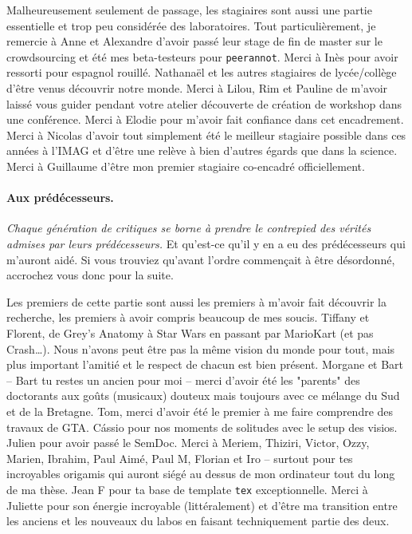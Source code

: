 Malheureusement seulement de passage, les stagiaires sont aussi une partie essentielle et trop peu considérée des laboratoires.
Tout particulièrement, je remercie à Anne et Alexandre d'avoir passé leur stage de fin de master sur le crowdsourcing et été mes beta-testeurs pour \texttt{peerannot}.
Merci à Inès pour avoir ressorti pour espagnol rouillé.
Nathanaël et les autres stagiaires de lycée/collège d'être venus découvrir notre monde.
Merci à Lilou, Rim et Pauline de m'avoir laissé vous guider pendant votre atelier découverte de création de workshop dans une conférence.
Merci à Elodie pour m'avoir fait confiance dans cet encadrement.
Merci à Nicolas d'avoir tout simplement été le meilleur stagiaire possible dans ces années à l'IMAG et d'être une relève à bien d'autres égards que dans la science.
Merci à Guillaume d'être mon premier stagiaire co-encadré officiellement.

\medskip

\paragraph*{Aux prédécesseurs.}
\emph{Chaque génération de critiques se borne à prendre le contrepied des vérités admises par leurs prédécesseurs.} Et qu'est-ce qu'il y en a eu des prédécesseurs qui m'auront aidé. Si vous trouviez qu'avant l'ordre commençait à être désordonné, accrochez vous donc pour la suite.

Les premiers de cette partie sont aussi les premiers à m'avoir fait découvrir la recherche, les premiers à avoir compris beaucoup de mes soucis.
Tiffany et Florent, de Grey's Anatomy à Star Wars en passant par MarioKart (et pas Crash\dots). Nous n'avons peut être pas la même vision du monde pour tout, mais plus important l'amitié et le respect de chacun est bien présent.
Morgane et Bart -- Bart tu restes un ancien pour moi -- merci d'avoir été les "parents" des doctorants aux goûts (musicaux) douteux mais toujours avec ce mélange du Sud et de la Bretagne.
Tom, merci d'avoir été le premier à me faire comprendre des travaux de GTA.
C\'{a}ssio pour nos moments de solitudes avec le setup des visios.
Julien pour avoir passé le SemDoc.
Merci à Meriem, Thiziri, Victor, Ozzy, Marien, Ibrahim, Paul Aimé, Paul M,  Florian et Iro -- surtout pour tes incroyables origamis qui auront siégé au dessus de mon ordinateur tout du long de ma thèse.
Jean F pour ta base de template \texttt{tex} exceptionnelle.
Merci à Juliette pour son énergie incroyable (littéralement) et d'être ma transition entre les anciens et les nouveaux du labos en faisant techniquement partie des deux.

